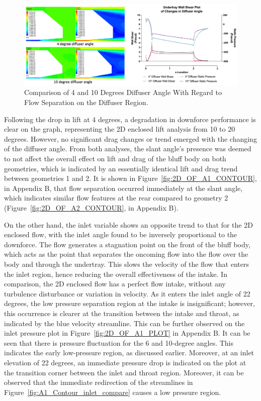 \begin{figure}[!htb]
    \centering
    \includegraphics[scale=0.52]{Figures/2D_OF/10_4_O_COMPARE CONTOUR.PNG}
    \caption{Comparison of 4 and 10 Degrees Diffuser Angle With Regard to Flow Separation on the Diffuser Region.}
    \label{fig:2D_OF_10_4_Contour_compare}
\end{figure}

\noindent Following the drop in lift at 4 degrees, a degradation in downforce performance is clear on the graph, representing the 2D enclosed lift analysis from 10 to 20 degrees. However, no significant drag changes or trend emerged with the changing of the diffuser angle. From both analyses, the slant angle's presence was deemed to not affect the overall effect on lift and drag of the bluff body on both geometries, which is indicated by an essentially identical lift and drag trend between geometries 1 and 2. It is shown in Figure~\ref{fig:2D_OF_A1_CONTOUR}, in Appendix B, that flow separation occurred immediately at the slant angle, which indicates similar flow features at the rear compared to geometry 2 (Figure~\ref{fig:2D_OF_A2_CONTOUR}, in Appendix B). 

\noindent On the other hand, the inlet variable shows an opposite  trend to that for the 2D enclosed flow, with the inlet angle found to be inversely proportional to the downforce. The flow generates a stagnation point on the front of the bluff body, which acts as the point that separates the oncoming flow into the flow over the body and through the undertray. This slows the velocity of the flow that enters the inlet region, hence reducing the overall effectiveness of the intake. In comparison, the 2D enclosed flow has a perfect flow intake, without any turbulence disturbance or variation in velocity. As it enters the inlet angle of 22 degrees, the low pressure separation region at the intake is insignificant; however, this occurrence is clearer at the transition between the intake and throat, as indicated by the blue velocity streamline. This can be further observed on the inlet pressure plot in Figure~\ref{fig:2D_OF_A1_PLOT} in Appendix B. It can be seen that there is pressure fluctuation for the 6 and 10-degree angles. This indicates the early low-pressure region, as discussed earlier. Moreover, at an inlet elevation of 22 degrees, an immediate pressure drop is indicated on the plot at the transition corner between the inlet and throat region. Moreover, it can be observed that the immediate redirection of the streamlines in Figure~\ref{fig:A1_Contour_inlet_compare} causes a low pressure region.

